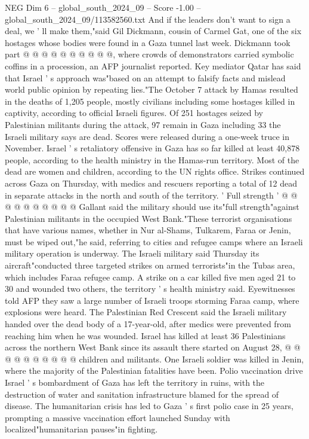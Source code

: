 \begin{textsample}{NEG Dim 6 – global\_south\_2024\_09 – Score -1.00 – global\_south\_2024\_09/113582560.txt}
And if the leaders don't want to sign a deal, we ' ll make them,"said Gil Dickmann, cousin of Carmel Gat, one of the six hostages whose bodies were found in a Gaza tunnel last week.
Dickmann took part @ @ @ @ @ @ @ @ @ @, where crowds of demonstrators carried symbolic coffins in a procession, an AFP journalist reported.
Key mediator Qatar has said that Israel ' s approach was"based on an attempt to falsify facts and mislead world public opinion by repeating lies."The October 7 attack by Hamas resulted in the deaths of 1,205 people, mostly civilians including some hostages killed in captivity, according to official Israeli figures.
Of 251 hostages seized by Palestinian militants during the attack, 97 remain in Gaza including 33 the Israeli military says are dead.
Scores were released during a one-week truce in November.
Israel ' s retaliatory offensive in Gaza has so far killed at least 40,878 people, according to the health ministry in the Hamas-run territory.
Most of the dead are women and children, according to the UN rights office.
Strikes continued across Gaza on Thursday, with medics and rescuers reporting a total of 12 dead in separate attacks in the north and south of the territory. ' Full strength ' @ @ @ @ @ @ @ @ @ @ Gallant said the military should use its"full strength"against Palestinian militants in the occupied West Bank."These terrorist organisations that have various names, whether in Nur al-Shams, Tulkarem, Faraa or Jenin, must be wiped out,"he said, referring to cities and refugee camps where an Israeli military operation is underway.
The Israeli military said Thursday its aircraft"conducted three targeted strikes on armed terrorists"in the Tubas area, which includes Faraa refugee camp.
A strike on a car killed five men aged 21 to 30 and wounded two others, the territory ' s health ministry said.
Eyewitnesses told AFP they saw a large number of Israeli troops storming Faraa camp, where explosions were heard.
The Palestinian Red Crescent said the Israeli military handed over the dead body of a 17-year-old, after medics were prevented from reaching him when he was wounded.
Israel has killed at least 36 Palestinians across the northern West Bank since its assault there started on August 28, @ @ @ @ @ @ @ @ @ @ children and militants.
One Israeli soldier was killed in Jenin, where the majority of the Palestinian fatalities have been.
Polio vaccination drive Israel ' s bombardment of Gaza has left the territory in ruins, with the destruction of water and sanitation infrastructure blamed for the spread of disease.
The humanitarian crisis has led to Gaza ' s first polio case in 25 years, prompting a massive vaccination effort launched Sunday with localized"humanitarian pauses"in fighting.

\end{textsample}
